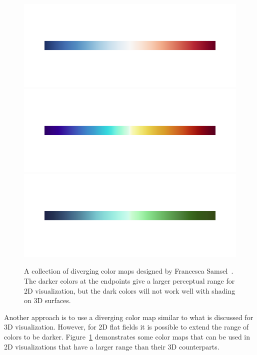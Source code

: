 \documentclass[letterpaper,twocolumn,fleqn]{article}
\newcommand*{\lcite}[1]{~\cite{#1}}
\begin{document}
\begin{figure}[htb]
  \centering
  \includegraphics[width=.9\linewidth,trim=0.5in 0.9in 0.5in 0.9in]
                  {ipython/CoolWarmExtended}
  \includegraphics[width=.9\linewidth,trim=0.5in 0.9in 0.5in 0.9in]
                  {ipython/BlueOrangeExtended}
  \includegraphics[width=.9\linewidth,trim=0.5in 0.9in 0.5in 0.9in]
                  {ipython/BlueGreenExtended}
  \caption{A collection of diverging color maps designed by Francesca
    Samsel\lcite{Samsel2015}. The darker colors at the endpoints give a
    larger perceptual range for 2D visualization, but the dark colors will
    not work well with shading on 3D surfaces.}
  \label{fig:ExtendedDiverging}
\end{figure}

Another approach is to use a diverging color map similar to what is
discussed for 3D visualization. However, for 2D flat fields it is possible
to extend the range of colors to be darker.
Figure~\ref{fig:ExtendedDiverging} demonstrates some color maps that can be
used in 2D visualizations that have a larger range than their 3D
counterparts.
\end{document}
